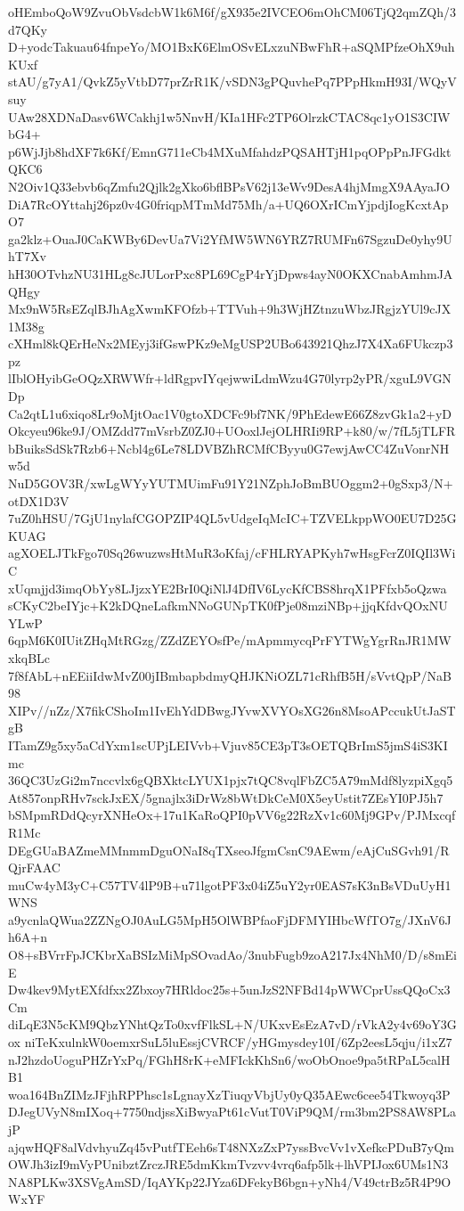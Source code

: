 oHEmboQoW9ZvuObVsdcbW1k6M6f/gX935e2IVCEO6mOhCM06TjQ2qmZQh/3d7QKy
D+yodcTakuau64fnpeYo/MO1BxK6ElmOSvELxzuNBwFhR+aSQMPfzeOhX9uhKUxf
stAU/g7yA1/QvkZ5yVtbD77prZrR1K/vSDN3gPQuvhePq7PPpHkmH93I/WQyVsuy
UAw28XDNaDasv6WCakhj1w5NnvH/KIa1HFc2TP6OlrzkCTAC8qc1yO1S3CIWbG4+
p6WjJjb8hdXF7k6Kf/EmnG711eCb4MXuMfahdzPQSAHTjH1pqOPpPnJFGdktQKC6
N2Oiv1Q33ebvb6qZmfu2Qjlk2gXko6bflBPsV62j13eWv9DesA4hjMmgX9AAyaJO
DiA7RcOYttahj26pz0v4G0friqpMTmMd75Mh/a+UQ6OXrICmYjpdjIogKcxtApO7
ga2klz+OuaJ0CaKWBy6DevUa7Vi2YfMW5WN6YRZ7RUMFn67SgzuDe0yhy9UhT7Xv
hH30OTvhzNU31HLg8cJULorPxc8PL69CgP4rYjDpws4ayN0OKXCnabAmhmJAQHgy
Mx9nW5RsEZqlBJhAgXwmKFOfzb+TTVuh+9h3WjHZtnzuWbzJRgjzYUl9cJX1M38g
cXHml8kQErHeNx2MEyj3ifGswPKz9eMgUSP2UBo643921QhzJ7X4Xa6FUkczp3pz
lIblOHyibGeOQzXRWWfr+ldRgpvIYqejwwiLdmWzu4G70lyrp2yPR/xguL9VGNDp
Ca2qtL1u6xiqo8Lr9oMjtOac1V0gtoXDCFc9bf7NK/9PhEdewE66Z8zvGk1a2+yD
Okcyeu96ke9J/OMZdd77mVsrbZ0ZJ0+UOoxlJejOLHRIi9RP+k80/w/7fL5jTLFR
bBuiksSdSk7Rzb6+Ncbl4g6Le78LDVBZhRCMfCByyu0G7ewjAwCC4ZuVonrNHw5d
NuD5GOV3R/xwLgWYyYUTMUimFu91Y21NZphJoBmBUOggm2+0gSxp3/N+otDX1D3V
7uZ0hHSU/7GjU1nylafCGOPZIP4QL5vUdgeIqMcIC+TZVELkppWO0EU7D25GKUAG
agXOELJTkFgo70Sq26wuzwsHtMuR3oKfaj/cFHLRYAPKyh7wHsgFcrZ0IQIl3WiC
xUqmjjd3imqObYy8LJjzxYE2BrI0QiNlJ4DfIV6LycKfCBS8hrqX1PFfxb5oQzwa
sCKyC2beIYjc+K2kDQneLafkmNNoGUNpTK0fPje08mziNBp+jjqKfdvQOxNUYLwP
6qpM6K0IUitZHqMtRGzg/ZZdZEYOsfPe/mApmmycqPrFYTWgYgrRnJR1MWxkqBLc
7f8fAbL+nEEiiIdwMvZ00jIBmbapbdmyQHJKNiOZL71cRhfB5H/sVvtQpP/NaB98
XIPv//nZz/X7fikCShoIm1IvEhYdDBwgJYvwXVYOsXG26n8MsoAPccukUtJaSTgB
ITamZ9g5xy5aCdYxm1scUPjLEIVvb+Vjuv85CE3pT3sOETQBrImS5jmS4iS3KImc
36QC3UzGi2m7nccvlx6gQBXktcLYUX1pjx7tQC8vqlFbZC5A79mMdf8lyzpiXgq5
At857onpRHv7sckJxEX/5gnajlx3iDrWz8bWtDkCeM0X5eyUstit7ZEsYI0PJ5h7
bSMpmRDdQcyrXNHeOx+17u1KaRoQPI0pVV6g22RzXv1c60Mj9GPv/PJMxcqfR1Mc
DEgGUaBAZmeMMnmmDguONaI8qTXseoJfgmCsnC9AEwm/eAjCuSGvh91/RQjrFAAC
muCw4yM3yC+C57TV4lP9B+u71lgotPF3x04iZ5uY2yr0EAS7sK3nBsVDuUyH1WNS
a9ycnlaQWua2ZZNgOJ0AuLG5MpH5OlWBPfaoFjDFMYIHbcWfTO7g/JXnV6Jh6A+n
O8+sBVrrFpJCKbrXaBSIzMiMpSOvadAo/3nubFugb9zoA217Jx4NhM0/D/s8mEiE
Dw4kev9MytEXfdfxx2Zbxoy7HRldoc25s+5unJzS2NFBd14pWWCprUssQQoCx3Cm
diLqE3N5cKM9QbzYNhtQzTo0xvfFlkSL+N/UKxvEsEzA7vD/rVkA2y4v69oY3Gox
niTeKxulnkW0oemxrSuL5luEssjCVRCF/yHGmysdey10I/6Zp2eesL5qju/i1xZ7
nJ2hzdoUoguPHZrYxPq/FGhH8rK+eMFIckKhSn6/woObOnoe9pa5tRPaL5calHB1
woa164BnZIMzJFjhRPPhsc1sLgnayXzTiuqyVbjUy0yQ35AEwc6cee54Tkwoyq3P
DJegUVyN8mIXoq+7750ndjssXiBwyaPt61cVutT0ViP9QM/rm3bm2PS8AW8PLajP
ajqwHQF8alVdvhyuZq45vPutfTEeh6sT48NXzZxP7yssBvcVv1vXefkcPDuB7yQm
OWJh3izI9mVyPUnibztZrczJRE5dmKkmTvzvv4vrq6afp5lk+lhVPIJox6UMs1N3
NA8PLKw3XSVgAmSD/IqAYKp22JYza6DFekyB6bgn+yNh4/V49ctrBz5R4P9OWxYF

